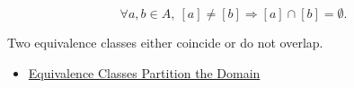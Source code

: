 \begin{remark*}
\[
\forall a,b\in A,\ [a]\ne[b] \Longrightarrow [a]\cap[b]=\emptyset.
\]
\end{remark*}

\begin{remark*}[Interpretation]
Two equivalence classes either coincide or do not overlap.
\end{remark*}

\begin{dependencies}
\begin{itemize}
  \item \hyperref[thm:equivalence-classes-partition-domain]{Equivalence Classes Partition the Domain}
\end{itemize}
\end{dependencies}
